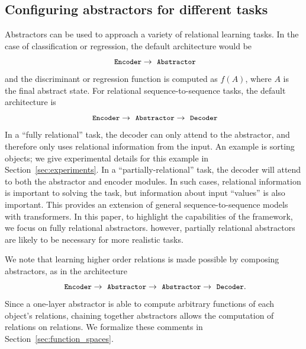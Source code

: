 \subsection{Configuring abstractors for different tasks}
\def\module#1{\mbox{\small\texttt{#1}}}

Abstractors can be used to approach a variety of relational learning tasks. In the case of classification
or regression, the default architecture would be
$$\module{Encoder} \rightarrow \module{Abstractor}$$
and the discriminant or regression function is computed as $f(A)$, where $A$ is the final abstract state.
For relational sequence-to-sequence tasks, the default architecture is
$$\module{Encoder} \rightarrow \module{Abstractor} \rightarrow \module{Decoder}$$
In a ``fully relational'' task, the decoder can only attend to the abstractor, and therefore
only uses relational information from the input. An example is sorting objects; we give
experimental details for this example in Section~\ref{sec:experiments}.
In a ``partially-relational'' task, the decoder will attend to both the abstractor and encoder modules. In such cases, relational information is important to solving the task, but information about input ``values'' is
also important.
This provides an extension of general sequence-to-sequence models with transformers.
In this paper, to highlight the capabilities of the framework, we focus on fully relational abstractors.
however, partially relational abstractors are likely to be necessary for more realistic tasks.

We note that learning higher order relations is made possible by composing
abstractors, as in the architecture
$$\module{Encoder} \rightarrow \module{Abstractor} \rightarrow \module{Abstractor} \rightarrow \module{Decoder}.$$
Since a one-layer abstractor is able to compute arbitrary functions of each object's relations,
chaining together abstractors allows the computation of relations on relations. We formalize
these comments in Section~\ref{sec:function_spaces}.

